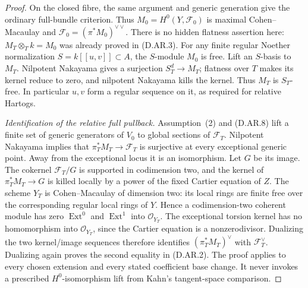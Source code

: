 \begin{proof}
On the closed fibre, the same argument and generic generation
give the ordinary full-bundle criterion. Thus
$M_0=H^0(Y,\mathcal F_0)$ is maximal Cohen--Macaulay and
$\mathcal F_0=(\pi^*M_0)^{\vee\vee}$.
There is no hidden flatness assertion here:
$M_T\otimes_Tk=M_0$ was already proved in (D.AR.3).
For any finite regular Noether normalization
$S=k[[u,v]]\subset A$, the $S$-module $M_0$ is free.
Lift an $S$-basis to $M_T$. Nilpotent Nakayama gives a
surjection $S_T^d\to M_T$; flatness over $T$ makes its kernel
reduce to zero, and nilpotent Nakayama kills the kernel.
Thus $M_T$ is $S_T$-free. In particular $u,v$ form a regular
sequence on it, as required for relative Hartogs.

\emph{Identification of the relative full pullback.}
Assumption~(2) and (D.AR.8) lift a finite set of generic
generators of $V_0$ to global sections of $\mathcal F_T$.
Nilpotent Nakayama implies that
$\pi_T^*M_T\to\mathcal F_T$ is surjective at every exceptional
generic point. Away from the exceptional locus it is an
isomorphism. Let $G$ be its image. The cokernel
$\mathcal F_T/G$ is supported in codimension two, and the
kernel of $\pi_T^*M_T\to G$ is killed locally by a power of
the fixed Cartier equation of $Z$.
The scheme $Y_T$ is Cohen--Macaulay of dimension two:
its local rings are finite free over the corresponding
regular local rings of $Y$. Hence a codimension-two
coherent module has zero $\operatorname{Ext}^0$ and
$\operatorname{Ext}^1$ into $\mathcal O_{Y_T}$.
The exceptional torsion kernel has no homomorphism into
$\mathcal O_{Y_T}$, since the Cartier equation is a
nonzerodivisor. Dualizing the two kernel/image sequences
therefore identifies
$(\pi_T^*M_T)^\vee$ with $\mathcal F_T^\vee$.
Dualizing again proves the second equality in (D.AR.2).
The proof applies to every chosen extension and every stated
coefficient base change. It never invokes a prescribed
$H^0$-isomorphism lift from Kahn's tangent-space comparison.
\end{proof}


